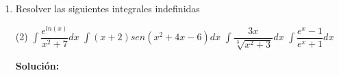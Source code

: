 \documentclass[12pt]{article}
\newenvironment{solucion}
{\begin{mdframed}[backgroundcolor=black!10]
		{\bf Solución:}\\
	}
	{
	\end{mdframed}
}
\newenvironment{preguntas}
{\begin{enumerate}\itemsep12pt
	}
	{
	\end{enumerate}
}
\begin{document}
\begin{preguntas}
\begin{solucion}
\begin{enumerate}[a)]
\item $\displaystyle\int (3x^2 + 2x + 1)dx = \displaystyle\int 3x^2dx + \displaystyle\int 2xdx + \displaystyle\int dx  = 3\displaystyle\int x^2dx + 2\displaystyle\int xdx + \displaystyle\int dx $
			$$= 3\dfrac{x^3}{3} + 2\dfrac{x^2}{2} + x + c = x^3 + x^2 + x + c$$
\item $\displaystyle\int x(x+1)(x+2)dx = \displaystyle\int (x^3+3x^2+2x)dx = \dfrac{x^4}{4}+x^3+x+c$
\item $\displaystyle\int sen^2(x)dx = \displaystyle\int \dfrac{1-cos(2x)}{2}dx = \displaystyle\int \dfrac{1}{2}dx - \displaystyle\int \dfrac{cos(2x)}{2} = \dfrac{x}{2} -\dfrac{sen(2x)}{4} + c$
\item $\displaystyle\int (1+e)^xdx = \dfrac{(1+e)^x}{ln(1+e)}$
\end{enumerate}
\end{solucion}
\item Resolver las siguientes integrales indefinidas
\begin{tasks}(2)
\task $\displaystyle\int \dfrac{e^{ln(x)}}{x^2+7}dx$
\task $\displaystyle\int (x+2)sen(x^2+4x-6)dx$
\task $\displaystyle\int \dfrac{3x}{\sqrt[3]{x^2+3}}dx$
\task $\displaystyle\int \dfrac{e^x-1}{e^x+1}dx$
\end{tasks}
\begin{solucion}


\end{solucion}
\end{preguntas}
\end{document}
